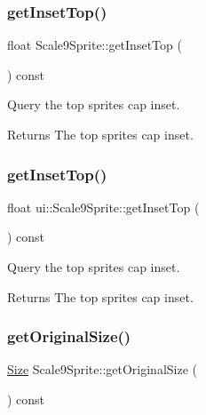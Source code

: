 \subsubsection{\texorpdfstring{get\+Inset\+Top()}{getInsetTop()}\hspace{0.1cm}{\footnotesize\ttfamily [1/2]}}
{\footnotesize\ttfamily float Scale9\+Sprite\+::get\+Inset\+Top (\begin{DoxyParamCaption}{ }\end{DoxyParamCaption}) const}



Query the top sprite\textquotesingle{}s cap inset. 

\begin{DoxyReturn}{Returns}
The top sprite\textquotesingle{}s cap inset. 
\end{DoxyReturn}
\mbox{\label{classui_1_1Scale9Sprite_a27abc5e0690a25e0cad56255601bc108}} 
\subsubsection{\texorpdfstring{get\+Inset\+Top()}{getInsetTop()}\hspace{0.1cm}{\footnotesize\ttfamily [2/2]}}
{\footnotesize\ttfamily float ui\+::\+Scale9\+Sprite\+::get\+Inset\+Top (\begin{DoxyParamCaption}{ }\end{DoxyParamCaption}) const}



Query the top sprite\textquotesingle{}s cap inset. 

\begin{DoxyReturn}{Returns}
The top sprite\textquotesingle{}s cap inset. 
\end{DoxyReturn}
\mbox{\label{classui_1_1Scale9Sprite_aa16747ee73288990f4c2c9978bb3f562}} 
\subsubsection{\texorpdfstring{get\+Original\+Size()}{getOriginalSize()}\hspace{0.1cm}{\footnotesize\ttfamily [1/2]}}
{\footnotesize\ttfamily \hyperlink{classSize}{Size} Scale9\+Sprite\+::get\+Original\+Size (\begin{DoxyParamCaption}{ }\end{DoxyParamCaption}) const}



